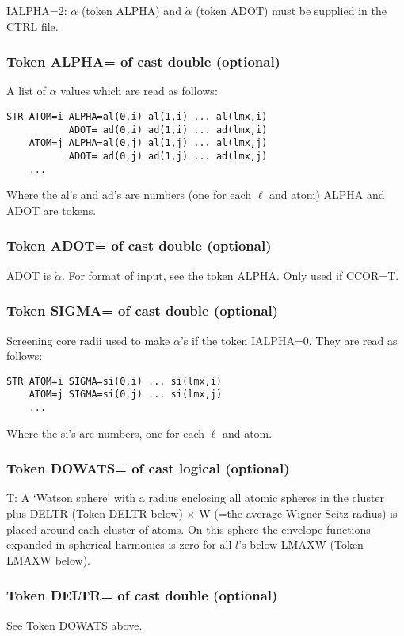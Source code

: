 \documentclass[aps,twocolumn,a4]{revtex4}
\begin{document}
IALPHA=2: $\alpha $ (token ALPHA) and $\dot \alpha $ (token ADOT)
must be supplied in the CTRL file.

\subsubsection{Token ALPHA= of cast double (optional)}
A list of $\alpha $ values which are read as follows:
\begin{verbatim}
STR ATOM=i ALPHA=al(0,i) al(1,i) ... al(lmx,i)
           ADOT= ad(0,i) ad(1,i) ... ad(lmx,i)
    ATOM=j ALPHA=al(0,j) al(1,j) ... al(lmx,j)
           ADOT= ad(0,j) ad(1,j) ... ad(lmx,j)
    ...
\end{verbatim}
Where the al's and ad's are numbers (one for each $\ell $ and
atom) ALPHA and ADOT are tokens.

\subsubsection{Token ADOT= of cast double (optional)}
ADOT is $\dot \alpha $. For format of input, see the token ALPHA.
Only used if CCOR=T.

\subsubsection{Token SIGMA= of cast double (optional)}
Screening core radii used to make $\alpha $'s if the token IALPHA=0.
They are read as follows:
\begin{verbatim}
STR ATOM=i SIGMA=si(0,i) ... si(lmx,i)
    ATOM=j SIGMA=si(0,j) ... si(lmx,j)
    ...
\end{verbatim}
Where the si's are numbers, one for each $\ell $ and atom.

\subsubsection{Token DOWATS= of cast logical (optional)}
T: A `Watson sphere' with a radius enclosing all atomic
spheres in the cluster plus DELTR (Token DELTR below) $\times $ W (=the
average Wigner-Seitz radius) is placed around each cluster of atoms.  On
this sphere the envelope functions expanded in spherical harmonics is
zero for all $l$'s below LMAXW (Token LMAXW below).

\subsubsection{Token DELTR= of cast double (optional)}
See Token DOWATS above.
\end{document}
